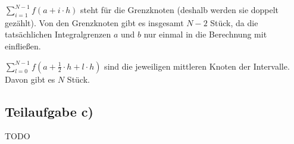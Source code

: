 $\sum_{i=1}^{N-1} f(a + i \cdot h)$ steht für die Grenzknoten
 (deshalb werden sie doppelt gezählt). Von den Grenzknoten gibt es 
insgesamt $N-2$ Stück, da die tatsächlichen Integralgrenzen $a$ und $b$ 
nur einmal in die Berechnung mit einfließen.

$\sum_{l=0}^{N-1} f(a + \frac{1}{2} \cdot h + l \cdot h)$ sind die jeweiligen 
mittleren Knoten der Intervalle. Davon gibt es $N$ Stück.

\subsection*{Teilaufgabe c)}
TODO
